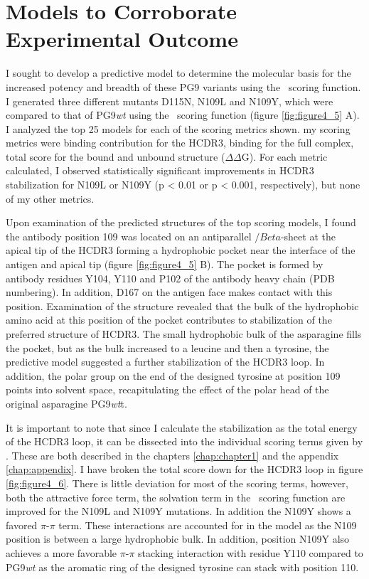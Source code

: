 \section{Models to Corroborate Experimental Outcome}
I sought to develop a predictive model to determine the molecular basis for the increased potency and breadth of these PG9 variants using the \rosetta~scoring function. I generated three different mutants D115N, N109L and N109Y, which were compared to that of PG9\textit{wt} using the \rosetta~scoring function (figure \ref{fig:figure4_5} A). I analyzed the top 25 models for each of the scoring metrics shown. my scoring metrics were binding contribution for the HCDR3, binding for the full complex, total score for the bound and unbound structure ($\Delta\Delta$G). For each metric calculated, I observed statistically significant improvements in HCDR3 stabilization for N109L or N109Y (p < 0.01 or p < 0.001, respectively), but none of my other metrics.

Upon examination of the predicted structures of the top scoring models, I found the antibody position 109 was located on an antiparallel $/Beta$-sheet at the apical tip of the HCDR3 forming a hydrophobic pocket near the interface of the antigen and apical tip (figure \ref{fig:figure4_5} B). The pocket is formed by antibody residues Y104, Y110 and P102 of the antibody heavy chain (PDB numbering). In addition, D167 on the antigen face makes contact with this position. Examination of the structure revealed that the bulk of the hydrophobic amino acid at this position of the pocket contributes to stabilization of the preferred structure of HCDR3. The small hydrophobic bulk of the asparagine fills the pocket, but as the bulk increased to a leucine and then a tyrosine, the predictive model suggested a further stabilization of the HCDR3 loop. In addition, the polar group on the end of the designed tyrosine at position 109 points into solvent space, recapitulating the effect of the polar head of the original asparagine PG9\textit{wt}t.

It is important to note that since I calculate the stabilization as the total energy of the HCDR3 loop, it can be dissected into the individual scoring terms given by \rosetta. These are both described in the chapters \ref{chap:chapter1} and the appendix \ref{chap:appendix}. I have broken the total score down for the HCDR3 loop in figure \ref{fig:figure4_6}. There is little deviation for most of the scoring terms, however, both the attractive force term, the solvation term in the \rosetta~scoring function are improved for the N109L and N109Y mutations. In addition the N109Y shows a favored $\pi$-$\pi$ term. These interactions are accounted for in the model as the N109 position is between a large hydrophobic bulk. In addition, position N109Y also achieves a more favorable $\pi$-$\pi$ stacking interaction with residue Y110 compared to PG9\textit{wt} as the aromatic ring of the designed tyrosine can stack with position 110.

